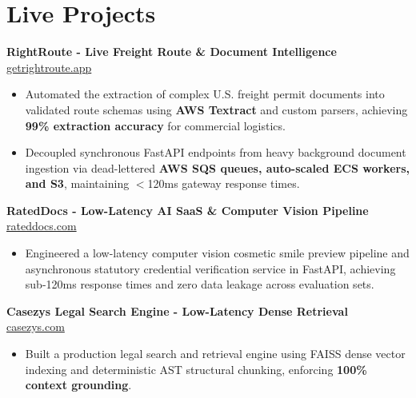 \documentclass[9.5pt,a4paper]{article}
\begin{document}
\section*{Live Projects}
\noindent
\textbf{RightRoute - Live Freight Route & Document Intelligence} \hfill \href{https://getrightroute.app}{getrightroute.app}
\begin{itemize}
    \item Automated the extraction of complex U.S. freight permit documents into validated route schemas using \textbf{AWS Textract} and custom parsers, achieving \textbf{99\% extraction accuracy} for commercial logistics.
    \item Decoupled synchronous FastAPI endpoints from heavy background document ingestion via dead-lettered \textbf{AWS SQS queues, auto-scaled ECS workers, and S3}, maintaining $<$120ms gateway response times.
\end{itemize}
\vspace{0.6pt}
\noindent
\textbf{RatedDocs - Low-Latency AI SaaS \& Computer Vision Pipeline} \hfill \href{https://rateddocs.com}{rateddocs.com}
\begin{itemize}
    \item Engineered a low-latency computer vision cosmetic smile preview pipeline and asynchronous statutory credential verification service in FastAPI, achieving sub-120ms response times and zero data leakage across evaluation sets.
\end{itemize}
\vspace{0.6pt}
\noindent
\textbf{Casezys Legal Search Engine - Low-Latency Dense Retrieval} \hfill \href{https://casezys.com}{casezys.com}
\begin{itemize}
    \item Built a production legal search and retrieval engine using FAISS dense vector indexing and deterministic AST structural chunking, enforcing \textbf{100\% context grounding}.
\end{itemize}
\vspace{0.6pt}
\end{document}

